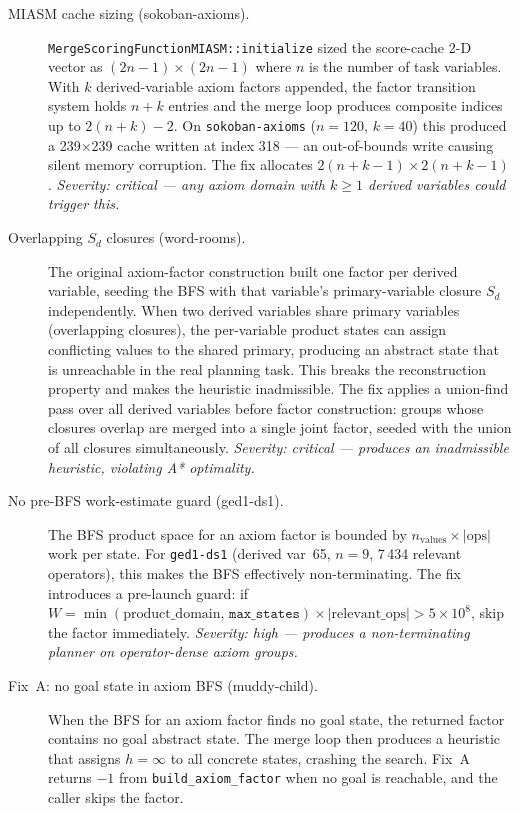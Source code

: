\documentclass[11pt,a4paper]{article}
\begin{document}
\begin{description}

\item[MIASM cache sizing (sokoban-axioms).] \texttt{MergeScoringFunctionMIASM::initialize}
sized the score-cache 2-D vector as $(2n-1)\times(2n-1)$ where $n$ is the
number of task variables.  With $k$ derived-variable axiom factors appended,
the factor transition system holds $n+k$ entries and the merge loop produces
composite indices up to $2(n+k)-2$.  On \texttt{sokoban-axioms} ($n=120$,
$k=40$) this produced a 239$\times$239 cache written at index 318 --- an
out-of-bounds write causing silent memory corruption.  The fix allocates
$2(n+k-1)\times 2(n+k-1)$.  \emph{Severity: critical --- any axiom domain
with $k\geq 1$ derived variables could trigger this.}

\item[Overlapping $S_d$ closures (word-rooms).] The original axiom-factor
construction built one factor per derived variable, seeding the BFS with that
variable's primary-variable closure $S_d$ independently.  When two derived
variables share primary variables (overlapping closures), the per-variable
product states can assign conflicting values to the shared primary, producing
an abstract state that is unreachable in the real planning task.  This breaks
the reconstruction property and makes the heuristic inadmissible.  The fix
applies a union-find pass over all derived variables before factor construction:
groups whose closures overlap are merged into a single joint factor, seeded
with the union of all closures simultaneously.  \emph{Severity: critical ---
produces an inadmissible heuristic, violating A* optimality.}

\item[No pre-BFS work-estimate guard (ged1-ds1).] The BFS product space for an
axiom factor is bounded by $n_{\mathrm{values}} \times \lvert\mathrm{ops}\rvert$
work per state.  For \texttt{ged1-ds1} (derived var~65, $n=9$, 7\,434 relevant
operators), this makes the BFS effectively non-terminating.  The fix introduces
a pre-launch guard: if $W = \min(\text{product\_domain},\,\texttt{max\_states})
\times \lvert\mathrm{relevant\_ops}\rvert > 5\times 10^8$, skip the factor
immediately.  \emph{Severity: high --- produces a non-terminating planner on
operator-dense axiom groups.}

\item[Fix~A: no goal state in axiom BFS (muddy-child).] When the BFS for an
axiom factor finds no goal state, the returned factor contains no goal abstract
state.  The merge loop then produces a heuristic that assigns $h=\infty$ to
all concrete states, crashing the search.  Fix~A returns $-1$ from
\texttt{build\_axiom\_factor} when no goal is reachable, and the caller skips
the factor.


\end{description}
\end{document}
